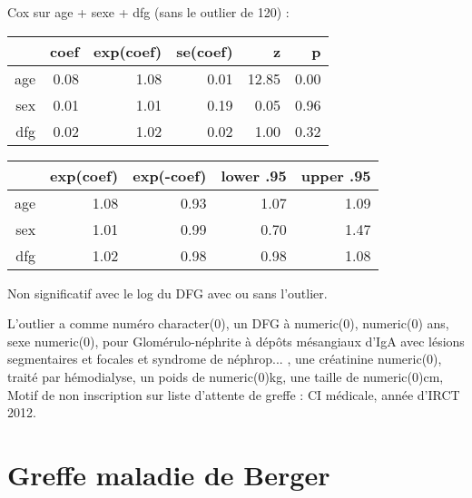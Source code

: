 \documentclass[11pt,a4paper]{article}\usepackage[]{graphicx}\usepackage[]{color}
\begin{document}
Cox sur age + sexe + dfg (sans le outlier de 120) :
\begin{table}[H]
\centering
\begin{tabular}{rrrrrr}
  \hline
 & coef & exp(coef) & se(coef) & z & p \\ 
  \hline
age & 0.08 & 1.08 & 0.01 & 12.85 & 0.00 \\ 
  sex & 0.01 & 1.01 & 0.19 & 0.05 & 0.96 \\ 
  dfg & 0.02 & 1.02 & 0.02 & 1.00 & 0.32 \\ 
   \hline
\end{tabular}
\end{table}
\begin{table}[H]
\centering
\begin{tabular}{rrrrr}
  \hline
 & exp(coef) & exp(-coef) & lower .95 & upper .95 \\ 
  \hline
age & 1.08 & 0.93 & 1.07 & 1.09 \\ 
  sex & 1.01 & 0.99 & 0.70 & 1.47 \\ 
  dfg & 1.02 & 0.98 & 0.98 & 1.08 \\ 
   \hline
\end{tabular}
\end{table}


Non significatif avec le log du DFG avec ou sans l'outlier.

L'outlier a comme numéro character(0), un DFG à numeric(0), numeric(0) ans, sexe numeric(0), pour Glomérulo-néphrite à dépôts mésangiaux d'IgA avec lésions segmentaires et focales et syndrome de néphrop... , une créatinine numeric(0), traité par hémodialyse, un poids de numeric(0)kg, une taille de numeric(0)cm, Motif de non inscription sur liste d'attente de greffe : CI médicale, année d'IRCT 2012.

  
\section{Greffe maladie de Berger}
\end{document}
